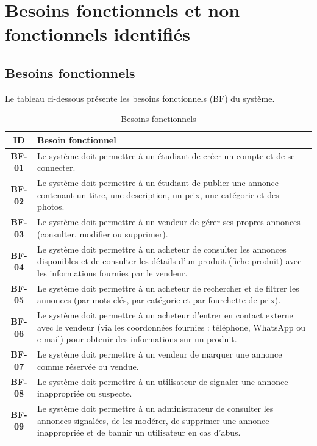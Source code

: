 ﻿\chapter{Besoins fonctionnels et non fonctionnels identifiés}

\section{Besoins fonctionnels}

Le tableau ci-dessous présente les besoins fonctionnels (BF) du système.

\begin{table}[ht]
\centering
\renewcommand{\arraystretch}{1.25}
\begin{tabularx}{\textwidth}{>{\bfseries}c X}
\toprule
\textbf{ID} & \textbf{Besoin fonctionnel} \\
\midrule
BF-01 & Le système doit permettre à un étudiant de créer un compte et de se connecter. \\
BF-02 & Le système doit permettre à un étudiant de publier une annonce contenant un titre, une description, un prix, une catégorie et des photos. \\
BF-03 & Le système doit permettre à un vendeur de gérer ses propres annonces (consulter, modifier ou supprimer). \\
BF-04 & Le système doit permettre à un acheteur de consulter les annonces disponibles et de consulter les détails d'un produit (fiche produit) avec les informations fournies par le vendeur. \\
BF-05 & Le système doit permettre à un acheteur de rechercher et de filtrer les annonces (par mots-clés, par catégorie et par fourchette de prix). \\
BF-06 & Le système doit permettre à un acheteur d'entrer en contact externe avec le vendeur (via les coordonnées fournies : téléphone, WhatsApp ou e-mail) pour obtenir des informations sur un produit. \\
BF-07 & Le système doit permettre à un vendeur de marquer une annonce comme réservée ou vendue. \\
BF-08 & Le système doit permettre à un utilisateur de signaler une annonce inappropriée ou suspecte. \\
BF-09 & Le système doit permettre à un administrateur de consulter les annonces signalées, de les modérer, de supprimer une annonce inappropriée et de bannir un utilisateur en cas d'abus. \\
\bottomrule
\end{tabularx}
\caption{Besoins fonctionnels}
\end{table}

